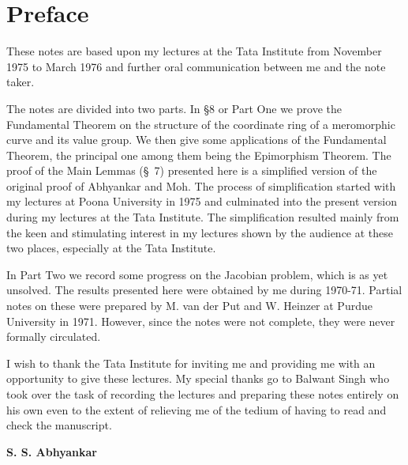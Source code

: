 \eject

\chapter{Preface}


These notes are based upon my lectures at the Tata Institute from
{\small November} 1975 to March 1976 and further oral communication between me
and the note taker. 

The notes are divided into two parts. In \S 8 or Part One we prove the
Fundamental Theorem on the structure of the coordinate ring of a
meromorphic curve and its value group. We then give some applications
of the Fundamental Theorem, the principal one among them being the
Epimorphism Theorem. The proof of the Main Lemmas (\S\ 7) presented
here is a simplified version of the original proof of Abhyankar and
Moh. The process of simplification started with my lectures at Poona
University in 1975 and culminated into the present version during my
lectures at the Tata Institute. The simplification resulted mainly
from the keen and stimulating interest in my lectures shown by the
audience at these two places, especially at the Tata Institute. 

In Part Two we record some progress on the Jacobian problem, which is
as yet unsolved. The results presented here were obtained by me during
1970-71. Partial notes on these were prepared by M. van der Put and
W. Heinzer at Purdue University in 1971. However, since the notes were
not complete, they were never formally circulated. 

I wish to thank the Tata Institute for inviting me and providing me
with an opportunity to give these lectures. My special thanks go to
Balwant Singh who took over the task of recording the lectures and
preparing these notes entirely on his own even to the extent of
relieving me of the tedium of having to read and check the
manuscript. 
\vskip 1cm

\hfill{\large\bf S. S. Abhyankar}
